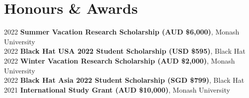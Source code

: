\section{Honours \& Awards}
\begin{itemize}[leftmargin=0.15in, label={}]
    \small{\item{
        {2022}{ \textbf{Summer Vacation Research Scholarship (AUD \$6,000)}, Monash University} \\
        {2022}{ \textbf{Black Hat USA 2022 Student Scholarship (USD \$595)}, Black Hat} \\
        {2022}{ \textbf{Winter Vacation Research Scholarship (AUD \$2,000)}, Monash University} \\
        {2022}{ \textbf{Black Hat Asia 2022 Student Scholarship (SGD \$799)}, Black Hat} \\
        {2021}{ \textbf{International Study Grant (AUD \$10,000)}, Monash University} \\
    }}
\end{itemize}
